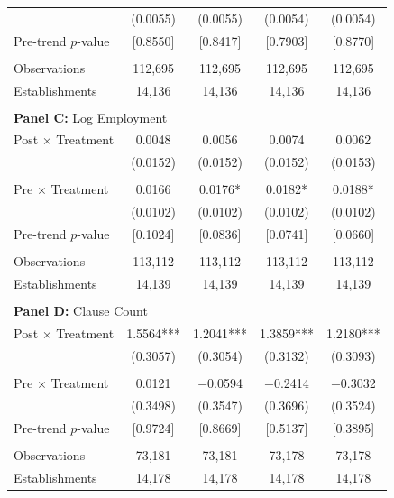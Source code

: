 \begin{table}[H]
\begin{threeparttable}
\begin{tabular}{lcccc}
  & (0.0055) & (0.0055) & (0.0054) & (0.0054) \\
Pre-trend $p$-value & [0.8550] & [0.8417] & [0.7903] & [0.8770] \\
  &  &  &  & \\
Observations & 112{,}695 & 112{,}695 & 112{,}695 & 112{,}695 \\
Establishments & 14{,}136 & 14{,}136 & 14{,}136 & 14{,}136 \\
  &  &  &  & \\
\midrule
\multicolumn{5}{l}{\textbf{Panel C:} Log Employment} \\
\midrule
Post $\times$ Treatment & 0.0048 & 0.0056 & 0.0074 & 0.0062 \\
  & (0.0152) & (0.0152) & (0.0152) & (0.0153) \\
  &  &  &  & \\
Pre $\times$ Treatment & 0.0166 & 0.0176* & 0.0182* & 0.0188* \\
  & (0.0102) & (0.0102) & (0.0102) & (0.0102) \\
Pre-trend $p$-value & [0.1024] & [0.0836] & [0.0741] & [0.0660] \\
  &  &  &  & \\
Observations & 113{,}112 & 113{,}112 & 113{,}112 & 113{,}112 \\
Establishments & 14{,}139 & 14{,}139 & 14{,}139 & 14{,}139 \\
  &  &  &  & \\
\midrule
\multicolumn{5}{l}{\textbf{Panel D:} Clause Count} \\
\midrule
Post $\times$ Treatment & 1.5564*** & 1.2041*** & 1.3859*** & 1.2180*** \\
  & (0.3057) & (0.3054) & (0.3132) & (0.3093) \\
  &  &  &  & \\
Pre $\times$ Treatment & 0.0121 & $-$0.0594 & $-$0.2414 & $-$0.3032 \\
  & (0.3498) & (0.3547) & (0.3696) & (0.3524) \\
Pre-trend $p$-value & [0.9724] & [0.8669] & [0.5137] & [0.3895] \\
  &  &  &  & \\
Observations & 73{,}181 & 73{,}181 & 73{,}178 & 73{,}178 \\
Establishments & 14{,}178 & 14{,}178 & 14{,}178 & 14{,}178 \\
\bottomrule
\end{tabular}
\scriptsize
\begin{tablenotes}

\end{tablenotes}
\end{threeparttable}
\end{table}

